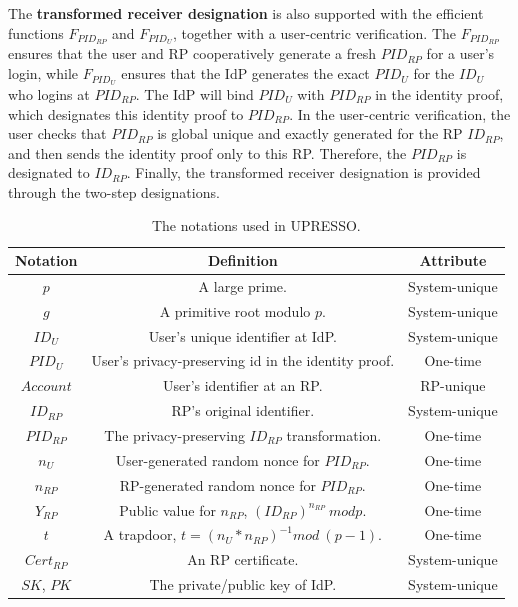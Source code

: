 The \textbf{transformed receiver designation} is also supported with the efficient functions $F_{PID_{RP}}$ and $F_{PID_U}$, together with  a user-centric verification.
The $F_{PID_{RP}}$ ensures that the user and RP cooperatively generate a fresh $PID_{RP}$  for a user's login,
 while $F_{PID_U}$ ensures that the IdP generates the exact $PID_U$ for the $ID_U$ who logins at $PID_{RP}$.
The IdP will bind $PID_{U}$ with $PID_{RP}$ in the identity proof, which designates this identity proof to $PID_{RP}$.
In the user-centric verification,  the user checks that $PID_{RP}$ is global unique and exactly generated for the RP $ID_{RP}$,
 and then sends the identity proof  only  to this RP. Therefore, the $PID_{RP}$ is designated to $ID_{RP}$.
Finally, the transformed receiver designation is provided through the two-step designations.


\begin{table}[tb]
    \caption{The notations used in UPRESSO.}
    \centering
    \begin{tabular}{|c|c|c|}
    \hline
    {Notation} & {Definition} & {Attribute} \\
    \hline
    {$p$} & {A large prime.} & {System-unique} \\
    \hline
    {$g$} & {A primitive root  modulo $p$. } & {System-unique} \\
    \hline
    {$ID_U$} & {User's unique identifier at IdP.} & {System-unique} \\
    \hline
    {$PID_U$} & {User's privacy-preserving id in the identity proof.} & {One-time}\\
    \hline
    {$Account$} & {User's identifier at an RP.} & {RP-unique} \\
    \hline
    {$ID_{RP}$} & {RP's original identifier.} & {System-unique} \\
    \hline
    {$PID_{RP}$} & {The privacy-preserving $ID_{RP}$ transformation.} & {One-time} \\
    \hline
    {$n_U$} & {User-generated random nonce for $PID_{RP}$.} & {One-time} \\
    \hline
    {$n_{RP}$} & {RP-generated random nonce for $PID_{RP}$.} & {One-time} \\
    \hline
    {$Y_{RP}$} & {Public value for $n_{RP}$, $(ID_{RP})^{n_{RP}} \ mod p$.} & {One-time} \\
    \hline
    {$t$} & {A trapdoor, $t=(n_U*n_{RP})^{-1} mod \ (p-1)$.} & {One-time} \\
    \hline
    {$Cert_{RP}$} & {An RP certificate. } & {System-unique} \\
    \hline
    {$SK$, $PK$} & {The private/public key of IdP. } & {System-unique} \\
     \hline
    \end{tabular}
    \label{tbl:notations}
\end{table}


